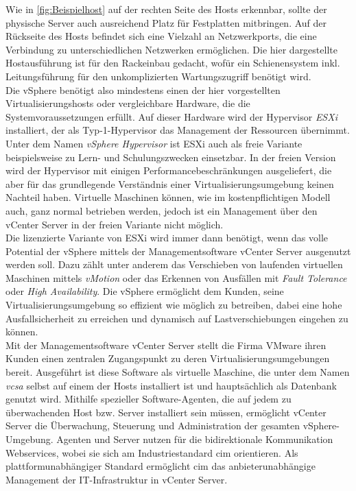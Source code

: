 Wie in \autoref{fig:Beispielhost} auf der rechten Seite des Hosts erkennbar, sollte der physische Server auch ausreichend Platz für Festplatten mitbringen. Auf der Rückseite des Hosts befindet sich eine Vielzahl an Netzwerkports, die eine Verbindung zu unterschiedlichen Netzwerken ermöglichen. Die hier dargestellte Hostausführung ist für den Rackeinbau gedacht, wofür ein Schienensystem inkl. Leitungsführung für den unkomplizierten Wartungszugriff benötigt wird.\medskip\\
Die vSphere benötigt also mindestens einen der hier vorgestellten Virtualisierungshosts oder vergleichbare Hardware, die die Systemvoraussetzungen erfüllt. Auf dieser Hardware wird der Hypervisor \textit{ESXi} installiert, der als Typ-1-Hypervisor das Management der Ressourcen übernimmt. Unter dem Namen \textit{vSphere Hypervisor} ist ESXi auch als freie Variante beispielsweise zu Lern- und Schulungszwecken einsetzbar. In der freien Version wird der Hypervisor mit einigen Performancebeschränkungen ausgeliefert, die aber für das grundlegende Verständnis einer Virtualisierungsumgebung keinen Nachteil haben. Virtuelle Maschinen können, wie im kostenpflichtigen Modell auch, ganz normal betrieben werden, jedoch ist ein Management über den vCenter Server in der freien Variante nicht möglich.~\cite[S.~42]{Wohrmann2018}\medskip\\
Die lizenzierte Variante von ESXi wird immer dann benötigt, wenn das volle Potential der vSphere mittels der Managementsoftware vCenter Server ausgenutzt werden soll. Dazu zählt unter anderem das Verschieben von laufenden virtuellen Maschinen mittels \textit{vMotion} oder das Erkennen von Ausfällen mit \textit{Fault Tolerance} oder \textit{High Availability}. Die vSphere ermöglicht dem Kunden, seine Virtualisierungsumgebung so effizient wie möglich zu betreiben, dabei eine hohe Ausfallsicherheit zu erreichen und dynamisch auf Lastverschiebungen eingehen zu können.~\cite[S.~46]{Wohrmann2018}\medskip\\
Mit der Managementsoftware vCenter Server stellt die Firma VMware ihren Kunden einen zentralen Zugangspunkt zu deren Virtualisierungsumgebungen bereit. Ausgeführt ist diese Software als virtuelle Maschine, die unter dem Namen \textit{\acrlong{vcsa}} selbst auf einem der Hosts installiert ist und hauptsächlich als Datenbank genutzt wird. Mithilfe spezieller Software-Agenten, die auf jedem zu überwachenden Host bzw. Server installiert sein müssen, ermöglicht vCenter Server die Überwachung, Steuerung und Administration der gesamten vSphere-Umgebung. Agenten und Server nutzen für die bidirektionale Kommunikation Webservices, wobei sie sich am Industriestandard \acrfull{cim} orientieren. Als plattformunabhängiger Standard ermöglicht \acrshort{cim} das anbieterunabhängige Management der IT-Infrastruktur in vCenter Server. ~\cite[S.~415]{Bengel2015}\medskip\\
